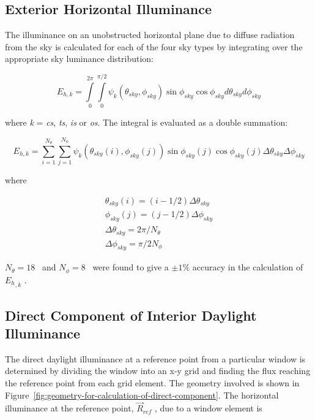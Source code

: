 \subsection{Exterior Horizontal Illuminance}\label{exterior-horizontal-illuminance}

The illuminance on an unobstructed horizontal plane due to diffuse radiation from the sky is calculated for each of the four sky types by integrating over the appropriate sky luminance distribution:

\begin{equation}
{E_{h,k}} = \int\limits_0^{2\pi } {\int\limits_0^{\pi /2} {{\psi_k}({\theta_{sky}},{\phi_{sky}})\sin {\phi_{sky}}\cos {\phi_{sky}}d{\theta_{sky}}} } d{\phi_{sky}}
\end{equation}

where \emph{k} = \emph{cs}, \emph{ts}, \emph{is} or \emph{os}. The integral is evaluated as a double summation:

\begin{equation}
{E_{h,k}} = \sum\limits_{i = 1}^{{N_\theta }} {\sum\limits_{j = 1}^{{N_\phi }} {{\psi_k}\left( {{\theta_{sky}}(i),{\phi_{sky}}(j)} \right)} } \sin {\phi_{sky}}(j)\cos {\phi_{sky}}(j)\Delta {\theta_{sky}}\Delta {\phi_{sky}}
\end{equation}

where

\begin{equation}
\begin{array}{l}
    \theta_{sky}(i) = (i - 1/2) \Delta \theta_{sky} \\
    \phi_{sky}(j) = (j - 1/2) \Delta \phi_{sky} \\
    \Delta \theta_{sky} = 2 \pi / N_{\theta} \\
    \Delta \phi_{sky} = \pi / 2N_{\phi} 
\end{array}
\end{equation}

\({N_\theta } = 18\) ~and \({N_\phi } = 8\) ~were found to give a \(\pm 1\%\) accuracy in the calculation of \({E_h}_{,k}\) .

\subsection{Direct Component of Interior Daylight Illuminance}\label{direct-component-of-interior-daylight-illuminance}

The direct daylight illuminance at a reference point from a particular window is determined by dividing the window into an x-y grid and finding the flux reaching the reference point from each grid element. The geometry involved is shown in Figure~\ref{fig:geometry-for-calculation-of-direct-component}. The horizontal illuminance at the reference point, \({\vec R_{ref}}\) , due to a window element is

